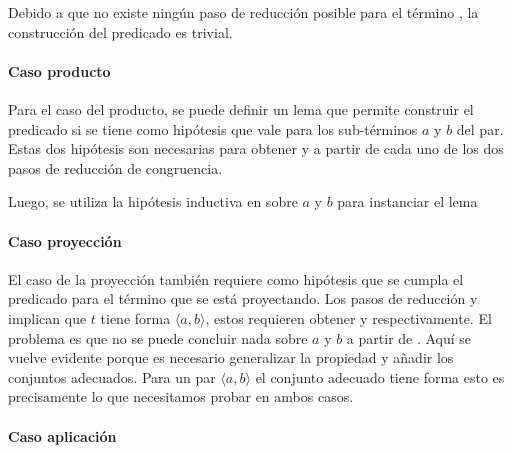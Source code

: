 \documentclass[]{report}
\begin{document}
	Debido a que no existe ningún paso de reducción posible para el término \AgdaInductiveConstructor{$\star$}, la construcción del predicado es trivial.
	

	\paragraph{Caso producto}
	
	Para el caso del producto, se puede definir un lema que permite construir el predicado si se tiene como hipótesis que \snstar vale para los sub-términos $a$ y $b$ del par.
	Estas dos hipótesis son necesarias para obtener \snstar {} y \snstar {} a partir de cada uno de los dos pasos de reducción de congruencia.
	
	
	Luego, se utiliza la hipótesis inductiva en  sobre $a$ y $b$ para instanciar el lema
	
	
	\paragraph{Caso proyección}
	
	El caso de la proyección también requiere como hipótesis que se cumpla el predicado para el término que se está proyectando.
	Los pasos de reducción  y  implican que $t$ tiene forma $\langle a, b \rangle$, estos requieren obtener \snstar {} y \snstar {} respectivamente.
	El problema es que no se puede concluir nada sobre $a$ y $b$ a partir de .
	Aquí se vuelve evidente porque es necesario generalizar la propiedad  y añadir los conjuntos adecuados.
	Para un par $\langle a, b \rangle$ el conjunto adecuado tiene forma
	\snstar{}  \snstar{}
	esto es precisamente lo que necesitamos probar en ambos casos.

	
	\paragraph{Caso aplicación}
	
\end{document}
